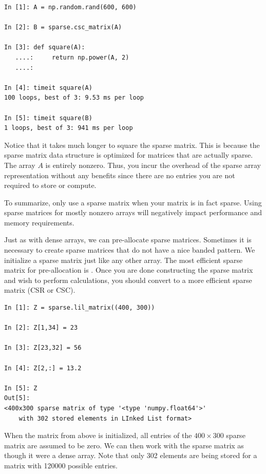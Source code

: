 \begin{lstlisting}
In [1]: A = np.random.rand(600, 600)

In [2]: B = sparse.csc_matrix(A)

In [3]: def square(A):
   ....:     return np.power(A, 2)
   ....: 

In [4]: timeit square(A)
100 loops, best of 3: 9.53 ms per loop

In [5]: timeit square(B)
1 loops, best of 3: 941 ms per loop
\end{lstlisting}

Notice that it takes much longer to square the sparse matrix.
This is because the sparse matrix data structure is optimized for matrices that are actually sparse. The array $A$ is entirely nonzero. Thus, you incur the overhead of the sparse array representation without any benefits since there are no entries you are not required to store or compute.

To summarize, only use a sparse matrix when your matrix is in fact sparse. Using sparse matrices for mostly nonzero arrays will negatively impact performance and memory requirements.

Just as with dense arrays, we can pre-allocate sparse matrices.
Sometimes it is necessary to create sparse matrices that do not have a nice banded pattern. We initialize a sparse matrix just like any other array. The most efficient sparse matrix for pre-allocation is . Once you are done constructing the sparse matrix and wish to perform calculations, you should convert to a more efficient sparse matrix (CSR or CSC).


\begin{lstlisting}
In [1]: Z = sparse.lil_matrix((400, 300))

In [2]: Z[1,34] = 23

In [3]: Z[23,32] = 56

In [4]: Z[2,:] = 13.2

In [5]: Z
Out[5]: 
<400x300 sparse matrix of type '<type 'numpy.float64'>'
	with 302 stored elements in LInked List format>

\end{lstlisting}

When the matrix  from above is initialized, all entries of the $400 \times 300$  sparse matrix are assumed to be zero. 
We can then work with the sparse matrix as though it were a dense array.
Note that only 302 elements are being stored for a matrix with 120000 possible entries. 
 
